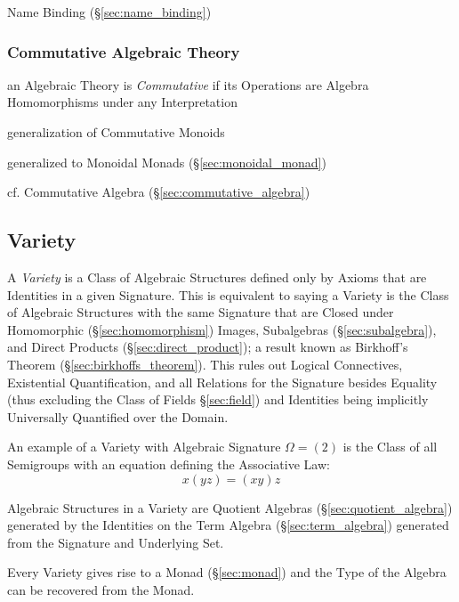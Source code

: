 Name Binding (\S\ref{sec:name_binding})



\subsubsection{Commutative Algebraic Theory}
\label{sec:commutative_algebraic_theory}

an Algebraic Theory is \emph{Commutative} if its Operations are Algebra
Homomorphisms under any Interpretation

generalization of Commutative Monoids

generalized to Monoidal Monads (\S\ref{sec:monoidal_monad})

\fist cf. Commutative Algebra (\S\ref{sec:commutative_algebra})



\subsection{Variety}\label{sec:variety}

A \emph{Variety} is a Class of Algebraic Structures defined only by
Axioms that are Identities in a given Signature. This is equivalent to
saying a Variety is the Class of Algebraic Structures with the same
Signature that are Closed under Homomorphic (\S\ref{sec:homomorphism})
Images, Subalgebras (\S\ref{sec:subalgebra}), and Direct Products
(\S\ref{sec:direct_product}); a result known as Birkhoff's Theorem
(\S\ref{sec:birkhoffs_theorem}). This rules out Logical Connectives,
Existential Quantification, and all Relations for the Signature
besides Equality (thus excluding the Class of Fields
\S\ref{sec:field}) and Identities being implicitly Universally
Quantified over the Domain.

An example of a Variety with Algebraic Signature $\Omega = (2)$ is the
Class of all Semigroups with an equation defining the Associative Law:
\[
    x(yz) = (xy)z
\]

Algebraic Structures in a Variety are Quotient Algebras
(\S\ref{sec:quotient_algebra}) generated by the Identities on the Term
Algebra (\S\ref{sec:term_algebra}) generated from the Signature and
Underlying Set.

Every Variety gives rise to a Monad (\S\ref{sec:monad}) and the Type
of the Algebra can be recovered from the Monad.

